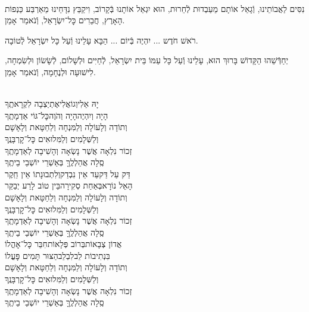 \documentclass[twoside, openany, parskip=half, 11pt]{book}
\begin{document}
\\
 נִסִּים לַאֲבוֹתֵינוּ, וְֿגָאַל אוֹתָם מֵעַבְדוּת לְֿחֵרוּת, הוּא יִגְאַל אוֹתָנוּ בְּֿקָרוֹב, וִיקַבֵּץ נִדָּחֵינוּ מֵאַרְבַּע כַּנְפוֹת הָאָרֶץ, חֲבֵרִים כׇּל־יִשְׂרָאֵל, וְֿנֹאמַר אָמֵן.

רֹאשׁ חֹדֶש ... יִהְיֶה בְּֿיוֹם ... הַבָּא עָלֵינוּ וְֿעַל כָּל יִשְׂרָאֵל לְֿטוֹבָה.

יְחַדְּֿשֵׁהוּ הַקָּדוֹשׁ בָּרוּךְ הוּא, עָלֵינוּ וְֿעַל כָּל עַמּוֹ בֵּית יִשְׂרָאֵל, לְֿחַיִּים וּלְשָׁלוֹם, לְֿשָׂשׂוֹן וּלְשִׂמְחָה, לִישׁוּעָה וּלְנֶחָמָה, וְֿנֹאמַר אָמֵן.

\begin{sometimes}
	\negline
\begin{narrow}
\\
יָהּ אֵלִי\hfill וְגוֹאֲלִי\hfill אֶתְיַצְבָה לִקְרָאתֶֽךָ\\
הָיָה וְיִהְיֶה\hfill הָיָה וְהֹוֶה\hfill כׇּל־גּוֹי אַדְמָתֶֽךָ\\
וְתוֹדָה וְלָעוֹלָה וְלַמִּנְחָה וְלַחַטָּאת וְלָאָשָׁם \\
וְלַשְּׁלָמִים וְלַמִּלוּאִים כׇּל־קׇרְבָּנֶֽךָ\\
זְכוֹר נִלְאָה אֲשֶׁר נָשְׂאָה וְהָשִׁיבָה לְאַדְמָתֶֽךָ\\
סֶֽלָה אֲהַלְלֶֽךָּ בְּאַשְׁרֵי יוֹשְׁבֵי בֵיתֶֽךָ\\
דַּק עַל דַּק\hfill עַד אֵין נִבְדַק\hfill וְלִתְבוּנָתוֹ אֵין חֵֽקֶר\\
הָאֵל נוֹרָא\hfill בְּאַחַת סְקִירָה\hfill בֵּין טוֹב לָרַע יְבַקֵּר\\
וְתוֹדָה וְלָעוֹלָה וְלַמִּנְחָה וְלַחַטָּאת וְלָאָשָׁם \\
וְלַשְּׁלָמִים וְלַמִּלוּאִים כׇּל־קׇרְבָּנֶֽךָ\\
זְכוֹר נִלְאָה אֲשֶׁר נָשְׂאָה וְהָשִׁיבָה לְאַדְמָתֶֽךָ\\
סֶֽלָה אֲהַלְלֶֽךָּ בְּאַשְׁרֵי יוֹשְׁבֵי בֵיתֶֽךָ\\
אֲדוֹן צְבָאוֹת\hfill בְּרוֹב פְּלָאוֹת\hfill חִבֵּר כׇּל־אׇהֳלוֹ\\
בִּנְתִיבוֹת לֵב\hfill לִבְלֵב\hfill הַצּוּר תָּמִים פׇּעֳלוֹ\\
וְתוֹדָה וְלָעוֹלָה וְלַמִּנְחָה וְלַחַטָּאת וְלָאָשָׁם \\
וְלַשְּׁלָמִים וְלַמִּלוּאִים כׇּל־קׇרְבָּנֶֽךָ\\
זְכוֹר נִלְאָה אֲשֶׁר נָשְׂאָה וְהָשִׁיבָה לְאַדְמָתֶֽךָ\\
סֶֽלָה אֲהַלְלֶֽךָּ בְּאַשְׁרֵי יוֹשְׁבֵי בֵיתֶֽךָ
\end{narrow}

\end{sometimes}
\end{document}
